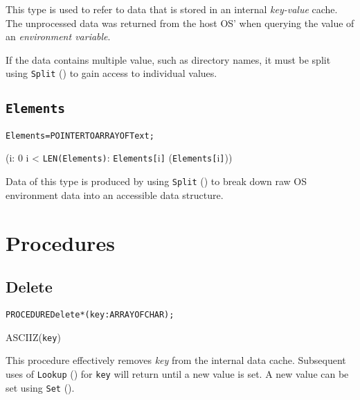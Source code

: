 \begin{invariant}
\end{invariant}

\begin{semantics}
  This type is used to refer to data that is stored in an internal
  \emph{key-value} cache.  The unprocessed data was returned from the
  host OS' when querying the value of an \emph{environment variable}.

  If the data contains multiple value, such as directory names, it
  must be split using \texttt{Split} () to
  gain access to individual values.
\end{semantics}


\subsection{\texttt{Elements}}\label{environment:elements}
\begin{alltt}
Elements = POINTER TO ARRAY OF Text;
\end{alltt}

\begin{invariant}
  (\forall i: 0 \leq i < \texttt{LEN(Elements\deref)}:
    \texttt{Elements[}i\texttt{]} \neq \nil \logicaland \valid(\texttt{Elements[}i\texttt{]\deref}))
\end{invariant}

\begin{semantics}
  Data of this type is produced by using \texttt{Split}
  () to break down raw OS environment data
  into an accessible data structure.
\end{semantics}


\section{Procedures}

\subsection{Delete}\label{environment:delete}
\begin{alltt}
  PROCEDURE Delete*(key : ARRAY OF CHAR);
\end{alltt}

\begin{precondition}
  ASCIIZ(\texttt{key})
\end{precondition}

\begin{semantics}
  This procedure effectively removes \emph{key} from the internal data
  cache.  Subsequent uses of \texttt{Lookup}
  () for \texttt{key} will return \nil until
  a new value is set.  A new value can be set using \texttt{Set}
  ().
\end{semantics}

